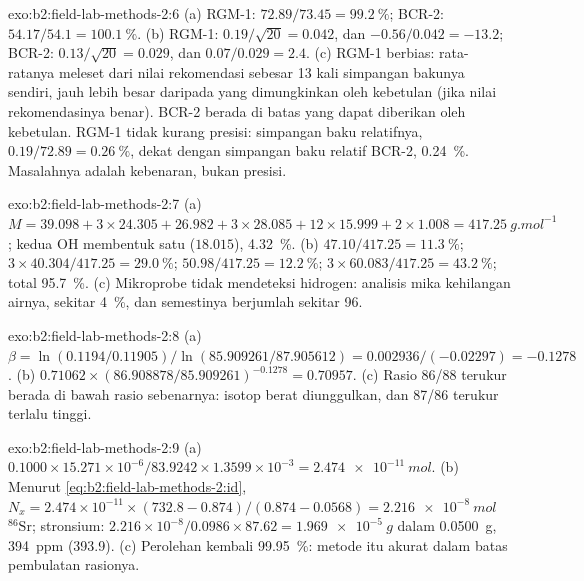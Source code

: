 \begin{solution}{exo:b2:field-lab-methods-2:6}
(a) RGM-1: $72.89/73.45 = \qty{99.2}{\percent}$; BCR-2: $54.17/54.1 = \qty{100.1}{\percent}$.
(b) RGM-1: $0.19/\sqrt{20} = 0.042$, dan $-0.56/0.042 = -13.2$; BCR-2: $0.13/\sqrt{20} = 0.029$, dan
$0.07/0.029 = 2.4$. (c) RGM-1 berbias: rata-ratanya meleset dari nilai rekomendasi sebesar 13 kali simpangan
bakunya sendiri, jauh lebih besar daripada yang dimungkinkan oleh kebetulan (jika nilai rekomendasinya benar). BCR-2 berada di
batas yang dapat diberikan oleh kebetulan. RGM-1 tidak kurang presisi: simpangan baku relatifnya,
$0.19/72.89 = \qty{0.26}{\percent}$, dekat dengan simpangan baku relatif BCR-2, \qty{0.24}{\percent}. Masalahnya adalah
kebenaran, bukan presisi.
\end{solution}

\begin{solution}{exo:b2:field-lab-methods-2:7}
(a) $M = 39.098 + 3 \times 24.305 + 26.982 + 3 \times 28.085 + 12 \times 15.999 + 2 \times 1.008 =
\qty{417.25}{g.mol^{-1}}$; kedua OH membentuk satu  ($18.015$), \qty{4.32}{\percent}.
(b)  $47.10/417.25 = \qty{11.3}{\percent}$;  $3 \times 40.304/417.25 =
\qty{29.0}{\percent}$;  $50.98/417.25 = \qty{12.2}{\percent}$;  $3 \times
60.083/417.25 = \qty{43.2}{\percent}$; total \qty{95.7}{\percent}. (c) Mikroprobe tidak
mendeteksi hidrogen: analisis mika kehilangan airnya, sekitar \qty{4}{\percent}, dan semestinya berjumlah sekitar
96.
\end{solution}

\begin{solution}{exo:b2:field-lab-methods-2:8}
(a) $\beta = \ln(0.1194/0.11905)/\ln(85.909261/87.905612) = 0.002936/(-0.02297) = -0.1278$.
(b) $0.71062 \times (86.908878/85.909261)^{-0.1278} = 0.70957$. (c) Rasio 86/88 terukur berada di bawah
rasio sebenarnya: isotop berat diunggulkan, dan 87/86 terukur terlalu tinggi.
\end{solution}

\begin{solution}{exo:b2:field-lab-methods-2:9}
(a) $0.1000 \times 15.271 \times 10^{-6}/83.9242 \times 1.3599 \times 10^{-3} = \qty{2.474e-11}{mol}$.
(b) Menurut \eqref{eq:b2:field-lab-methods-2:id}, $N_x = 2.474 \times 10^{-11} \times (732.8 -
0.874)/(0.874 - 0.0568) = \qty{2.216e-8}{mol}$ $^{86}\mathrm{Sr}$; stronsium: $2.216 \times
10^{-8}/0.0986 \times 87.62 = \qty{1.969e-5}{g}$ dalam \qty{0.0500}{g}, \qty{394}{ppm} (393.9).
(c) Perolehan kembali \qty{99.95}{\percent}: metode itu akurat dalam batas pembulatan rasionya.
\end{solution}

